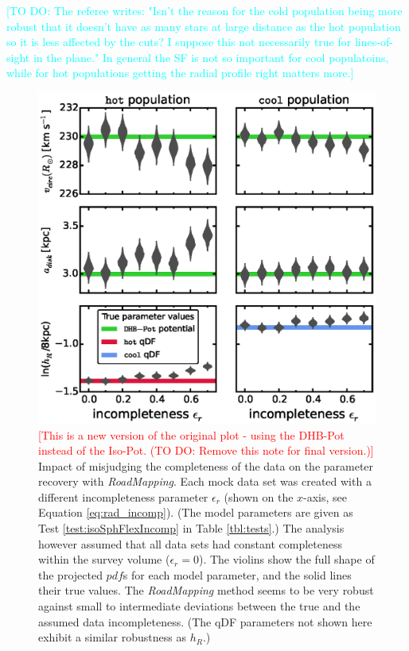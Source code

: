 \documentclass[iop,revtex4]{emulateapj}
\newcommand{\pdf}{\ensuremath{pdf}}
\newcommand{\RM}{{\sl RoadMapping}}
\newcommand{\HW}[1]{\textcolor{Cyan}{#1}}
\newcommand{\NOTE}[1]{\textcolor{Red}{#1}}
\begin{document}
\HW{[TO DO: The referee writes: "Isn't the reason for the cold population being more robust that it doesn't have as many stars at large distance as the hot population so it is less affected by the cuts? I suppose this not necessarily true for lines-of-sight in the plane." In general the SF is not so important for cool populatoins, while for hot populations getting the radial profile right matters more.]}

\begin{figure}[!htbp]
\centering
\includegraphics[width=\columnwidth]{figs/MWbdhIncompR_violins.eps}
\caption{\NOTE{[This is a new version of the original plot - using the DHB-Pot instead of the Iso-Pot. (TO DO: Remove this note for final version.)]}  Impact of misjudging the completeness of the data on the parameter recovery with \RM{}. Each mock data set was created with a different incompleteness parameter $\epsilon_r$ (shown on the $x$-axis, see Equation \eqref{eq:rad_incomp}). (The model parameters are given as Test \ref{test:isoSphFlexIncomp} in Table \ref{tbl:tests}.) The analysis however assumed that all data sets had constant completeness within the survey volume ($\epsilon_r = 0$). The violins show the full shape of the projected \pdf{}s for each model parameter, and the solid lines their true values. The \RM{} method seems to be very robust against small to intermediate deviations between the true and the assumed data incompleteness. (The qDF parameters not shown here exhibit a similar robustness as $h_R$.)} 
\label{fig:MWdhbIncompR_violins}
\end{figure}
\end{document}
